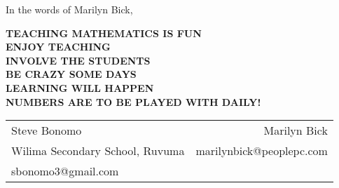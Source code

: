 In the words of Marilyn Bick,
\begin{center}
\textbf{TEACHING MATHEMATICS IS FUN}\\
\textbf{ENJOY TEACHING}\\
\textbf{INVOLVE THE STUDENTS}\\
\textbf{BE CRAZY SOME DAYS}\\
\textbf{LEARNING WILL HAPPEN}\\
\textbf{NUMBERS ARE TO BE PLAYED WITH DAILY!}\\[24pt]
\end{center}
\begin{tabular}{p{}p{}}
\multicolumn{1}{l}{Steve Bonomo} & \multicolumn{1}{r}{Marilyn Bick}\\
\multicolumn{1}{l}{Wilima Secondary School, Ruvuma} & \multicolumn{1}{r}{marilynbick@peoplepc.com}\\
\multicolumn{1}{l}{sbonomo3@gmail.com} & 
\end{tabular}


